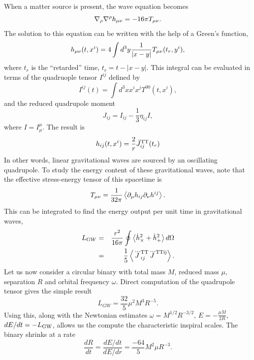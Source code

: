 When a matter source is present, the wave equation becomes
\begin{equation}
\nabla_{\rho}\nabla^{\rho}h_{\mu\nu}=-16\pi T_{\mu\nu}.
\end{equation}
The solution to this equation can be written with the help of a Green's function,
\begin{equation}
h_{\mu\nu}(t,x^{i})=4\int{d^3y\frac{1}{|x-y|}T_{\mu\nu}(t_r,y^i)},
\end{equation}
where $t_r$ is the ``retarded'' time, $t_r=t-|x-y|$. This integral can be evaluated in terms of the quadruople tensor $I^{ij}$ defined by
\begin{equation}
I^{ij}(t)=\int{d^3x x^ix^jT^{00}(t,x^i)},
\end{equation}
and the reduced quadrupole moment
\begin{equation}
J_{ij}=I_{ij}-\frac{1}{3}\eta_{ij}I,
\end{equation}
where $I=I^{\mu}_{\mu}$.
The result is
\begin{equation}
h_{ij}(t,x^i)=\frac{2}{r}\ddot{J}_{ij}^{\rm{TT}}(t_r)
\end{equation}
In other words, linear gravitational waves are sourced by an oscillating quadrupole. To study the energy content of these gravitational waves, note that the effective stress-energy tensor of this spacetime is
\begin{equation}
T_{\mu\nu}=\frac{1}{32\pi}\left<\partial_{\mu}h_{ij}\partial_{\nu}h^{ij}\right>.
\end{equation}
This can be integrated to find the energy output per unit time in gravitational waves,
\begin{eqnarray}
\label{eq:LGW}
L_{GW}&=&\frac{r^2}{16\pi}\oint{\left<\dot{h}_{\times}^2+\dot{h}_{+}^2\right>d\Omega}\\
&=&\frac{1}{5}\left<\dddot{J}_{ij}^{\rm{TT}}\dddot{J}^{\rm{TT} ij}\right>.
\end{eqnarray}
Let us now consider a circular binary with total mass $M$, reduced mass $\mu$, separation $R$ and orbital frequency $\omega$. Direct computation of the quadrupole tensor gives the simple result
\begin{equation}
L_{GW}=\frac{32}{5}\mu^2M^3R^{-5}.
\end{equation}
Using this, along with the Newtonian estimates $\omega=M^{1/2}R^{-3/2}$, $E=-\frac{\mu M}{2R}$, $dE/dt=-L_{\rm GW}$, allows us the compute the characteristic inspiral scales. The binary shrinks at a rate
\begin{equation}
\frac{dR}{dt}=\frac{dE/dt}{dE/dr}=\frac{-64}{5}M^2\mu R^{-3}.
\end{equation}
